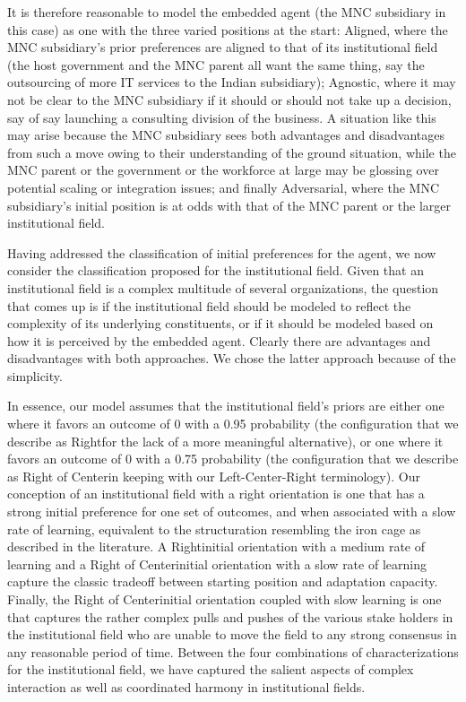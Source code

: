 \documentclass[12pt,letterpaper]{article}
\begin{document}
It is therefore reasonable to model the embedded agent (the MNC subsidiary in this case) as one with the three varied positions at the start: Aligned, where the MNC subsidiary's prior preferences are aligned to that of its institutional field (the host government and the MNC parent all want the same thing, say the outsourcing of more IT services to the Indian subsidiary); Agnostic, where it may not be clear to the MNC subsidiary if it should or should not take up a decision, say of say launching a consulting division of the business. A situation like this may arise because the MNC subsidiary sees both advantages and disadvantages from such a move owing to their understanding of the ground situation, while the MNC parent or the government or the workforce at large may be glossing over potential scaling or integration issues; and finally Adversarial, where the MNC subsidiary's initial position is at odds with that of the MNC parent or the larger institutional field.  

Having addressed the classification of initial preferences for the agent, we now consider the classification proposed for the institutional field. Given that an institutional field is a complex multitude of several organizations, the question that comes up is if the institutional field should be modeled to reflect the complexity of its underlying constituents, or if it should be modeled based on how it is perceived by the embedded agent. Clearly there are advantages and disadvantages with both approaches. We chose the latter approach because of the simplicity. 

In essence, our model assumes that the institutional field's priors are either one where it favors an outcome of 0 with a 0.95 probability (the configuration that we describe as \textquotesingle Right\textquotesingle  for the lack of a more meaningful alternative), or one where it favors an outcome of 0 with a 0.75 probability (the configuration that we describe as \textquotesingle Right of Center\textquotesingle  in keeping with our Left-Center-Right terminology). Our conception of an institutional field with a right orientation is one that has a strong initial preference for one set of outcomes, and when associated with a slow rate of learning, equivalent to the structuration resembling the iron cage as described in the literature. A \textquotesingle Right\textquotesingle  initial orientation with a medium rate of learning and a \textquotesingle Right of Center\textquotesingle  initial orientation with a slow rate of learning capture the classic tradeoff between starting position and adaptation capacity. Finally, the \textquotesingle Right of Center\textquotesingle  initial orientation coupled with slow learning is one that captures the rather complex pulls and pushes of the various stake holders in the institutional field who are unable to move the field to any strong consensus in any reasonable period of time. Between the four combinations of characterizations for the institutional field,  we have captured the salient aspects of complex interaction as well as coordinated harmony in institutional fields.
\end{document}
